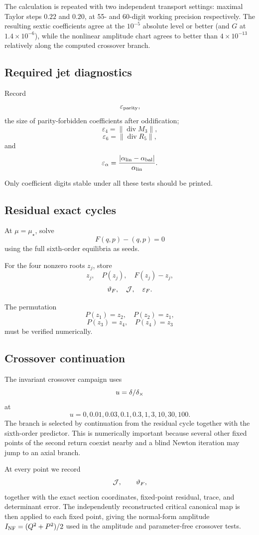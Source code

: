 The calculation is repeated with two independent transport settings: maximal Taylor steps $0.22$ and $0.20$, at 55- and 60-digit working precision respectively.  The resulting sextic coefficients agree at the $10^{-5}$ absolute level or better (and $G$ at $1.4\times10^{-6}$), while the nonlinear amplitude chart agrees to better than $4\times10^{-13}$ relatively along the computed crossover branch.

\subsection{Required jet diagnostics}

Record
\[
\varepsilon_{\rm parity},
\]
the size of parity-forbidden coefficients after oddification;
\[
\varepsilon_4=\|\operatorname{div}M_3\|,
\]
\[
\varepsilon_6=\|\operatorname{div}R_5\|,
\]
and
\[
\varepsilon_\alpha
=
\frac{|\alpha_{\rm lin}-\alpha_{\rm bal}|}{\alpha_{\rm lin}}.
\]

Only coefficient digits stable under all these tests should be printed.

\subsection{Residual exact cycles}

At \(\mu=\mu_\star\), solve
\[
F(q,p)-(q,p)=0
\]
using the full sixth-order equilibria as seeds.

For the four nonzero roots \(z_j\), store
\[
z_j,\quad P(z_j),\quad F(z_j)-z_j,
\]
\[
\vartheta_F,\quad \mathcal{J},\quad \varepsilon_F.
\]

The permutation
\[
P(z_1)=z_2,\quad P(z_2)=z_1,
\]
\[
P(z_3)=z_4,\quad P(z_4)=z_3
\]
must be verified numerically.

\subsection{Crossover continuation}

The invariant crossover campaign uses
\[
u=\delta/\delta_\times
\]
at
\[
u=
0,0.01,0.03,0.1,0.3,1,3,10,30,100.
\]
The branch is selected by continuation from the residual cycle together with the sixth-order predictor.  This is numerically important because several other fixed points of the second return coexist nearby and a blind Newton iteration may jump to an axial branch.

At every point we record
\[
\mathcal{J},\qquad
\vartheta_F,
\]
together with the exact section coordinates, fixed-point residual, trace, and determinant error.  The independently reconstructed critical canonical map is then applied to each fixed point, giving the normal-form amplitude $I_{\rm NF}=(Q^2+P^2)/2$ used in the amplitude and parameter-free crossover tests.

